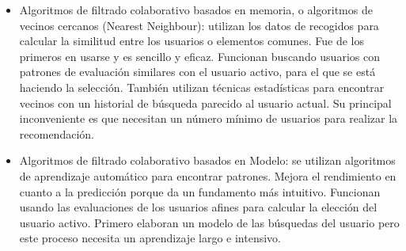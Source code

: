 \documentclass[preprint,12pt]{elsarticle}
\begin{document}
\begin{enumerate}[3.1]
	\begin{itemize}
	\item Algoritmos de filtrado colaborativo basados en memoria, o algoritmos de vecinos cercanos (Nearest Neighbour): utilizan los datos de recogidos para calcular la similitud entre los usuarios o elementos comunes. Fue de los primeros en usarse y es sencillo y eficaz. Funcionan buscando usuarios con patrones de evaluación similares con el usuario activo, para el que se está haciendo la selección. También utilizan técnicas estadísticas para encontrar vecinos con un historial de búsqueda parecido al usuario actual. Su principal inconveniente es que necesitan un número mínimo de usuarios para realizar la recomendación. \\
	\item Algoritmos de filtrado colaborativo basados en Modelo: se utilizan algoritmos de aprendizaje automático para encontrar patrones. Mejora el rendimiento en cuanto a la predicción porque da un fundamento más intuitivo. Funcionan usando las evaluaciones de los usuarios afines para calcular la elección del usuario activo. Primero elaboran un modelo de las búsquedas del usuario pero este proceso necesita un aprendizaje largo e intensivo.	\\
	\end{itemize}
	

\end{enumerate}
\end{document}
